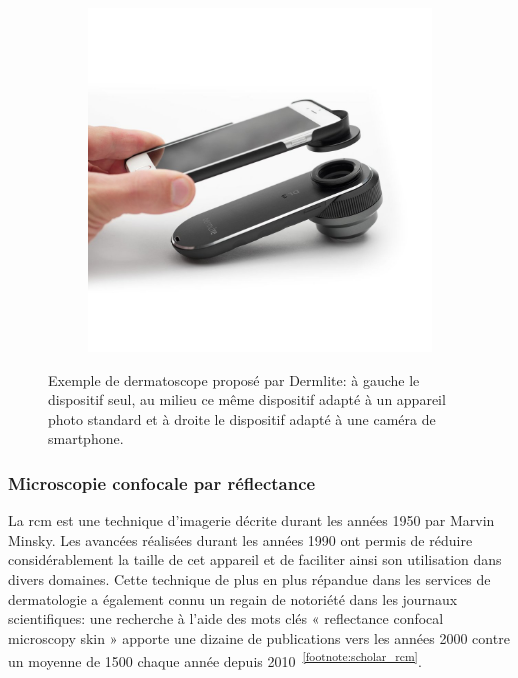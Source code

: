 \begin{figure}[H]
\begin{subfigure}{.32\textwidth}
    \end{subfigure}
    \begin{subfigure}{.32\textwidth}
      \centering
      \includegraphics[width=\linewidth]{contents/chapter_2/resources/example_device_dermlite_3.png}
    \end{subfigure}
    \caption{Exemple de dermatoscope proposé par Dermlite: à gauche le dispositif seul, au milieu ce même dispositif adapté à un appareil photo standard et à droite le dispositif adapté à une caméra de smartphone.}
    \label{fig:example_device_dermlite}
\end{figure}\par

\subsubsection{Microscopie confocale par réflectance}
La \gls{rcm} est une technique d’imagerie décrite durant les années 1950 par Marvin Minsky. Les avancées réalisées durant les années 1990 ont permis de réduire considérablement la taille de cet appareil et de faciliter ainsi son utilisation dans divers domaines. Cette technique de plus en plus répandue dans les services de dermatologie a également connu un regain de notoriété dans les journaux scientifiques: une recherche à l’aide des mots clés « reflectance confocal microscopy skin » apporte une dizaine de publications vers les années 2000 contre un moyenne de 1500 chaque année depuis 2010~\textsuperscript{\ref{footnote:scholar_rcm}}.\par

